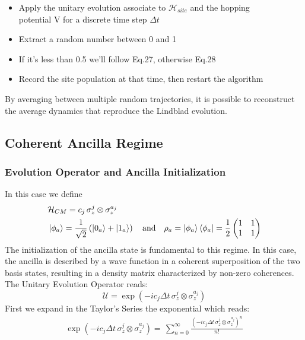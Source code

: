 \documentclass[a4paper,12pt]{article}
\begin{document}
	\begin{itemize}
		\item [1.] Apply the unitary evolution associate to $ \mathcal{H}_{site} $ and the hopping \\ potential V for a discrete time step $ \Delta t $
		\item [2.] Extract a random number between 0 and 1
		\item [3.] If it's less than 0.5 we'll follow Eq.27, otherwise Eq.28
		\item [4.] Record the site population at that time, then restart the algorithm
	\end{itemize}

	By averaging between multiple random trajectories, it is possible to reconstruct the average dynamics that reproduce the Lindblad evolution.

	\clearpage
	\newpage

	\subsection{Coherent Ancilla Regime}
	\label{sec:Coherent_Ancilla_Regime }

	\subsubsection{Evolution Operator and Ancilla Initialization}
	\label{sub:Evolution_Operator_and_Ancilla_Initialization_Cohe}

	In this case we define
	\begin{align}
		&\mathcal{H}_{CM} = c_{j} \, \sigma_{z}^{j} \otimes \sigma_{z}^{a_j} \\
		&\ket{\phi_{a}} = \frac{1}{\sqrt{2}} \left(\ket{0_a} + \ket{1_a}\right) \quad \text{and} \quad \rho_{a} = \ket{\phi_a}\bra{\phi_a} = \frac{1}{2} \begin{pmatrix} 1 & 1 \\ 1 & 1 \end{pmatrix}
		\label{eq:cohe_initialization}
	\end{align}
	The initialization of the ancilla state is fundamental to this regime. In this case, the ancilla is described by a wave function in a coherent superposition of the two basis states, resulting in a density matrix characterized by non-zero coherences. \\
	The Unitary Evolution Operator reads:
	\begin{equation}
		\mathcal{U} = \exp{\left( -i c_j \Delta t \, \sigma_{z}^{j} \otimes \sigma_{z}^{a_j} \right)}
		\label{eq:U_def_cohe}
	\end{equation}
	First we expand in the Taylor's Series the exponential which reads:
	\begin{gather}
		\exp{\left( -i c_j \Delta t \, \sigma_{z}^{j} \otimes \sigma_{z}^{a_j} \right)} = \, \sum_{n=0}^{\infty}{\frac{\left( -i c_j \Delta t \, \sigma_{z}^{j} \otimes \sigma_{z}^{a_j} \right)^n}{n!} }
		\label{eq:exp_series_cohe}
	\end{gather}
\end{document}

